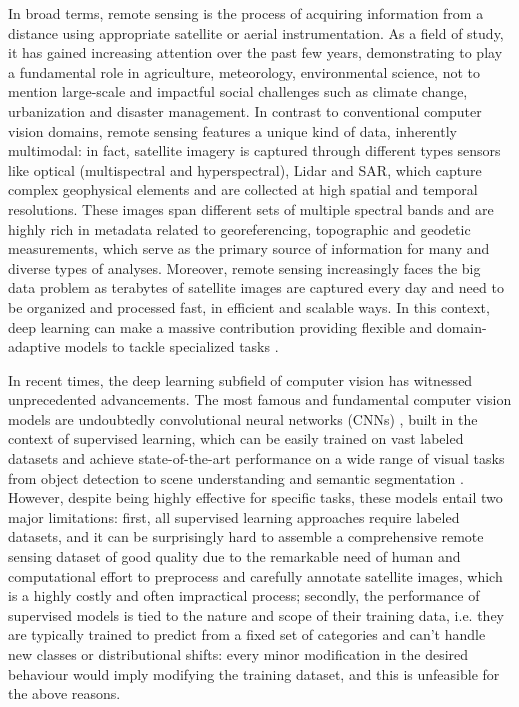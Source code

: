 \documentclass[a4paper, oneside, english]{sapthesis} %
\begin{document}
In broad terms, remote sensing is the process of acquiring information from a distance using appropriate satellite or aerial instrumentation. As a field of study, it has gained increasing attention over the past few years, demonstrating to play a fundamental role in agriculture, meteorology, environmental science, not to mention large-scale and impactful social challenges such as climate change, urbanization and disaster management. In contrast to conventional computer vision domains, remote sensing features a unique kind of data, inherently multimodal: in fact, satellite imagery is captured through different types sensors like optical (multispectral and hyperspectral), Lidar and SAR, which capture complex geophysical elements and are collected at high spatial and temporal resolutions. These images span different sets of multiple spectral bands and are highly rich in metadata related to georeferencing, topographic and geodetic measurements, which serve as the primary source of information for many and diverse types of analyses. Moreover, remote sensing increasingly faces the big data problem as terabytes of satellite images are captured every day and need to be organized and processed fast, in efficient and scalable ways. In this context, deep learning can make a massive contribution providing flexible and domain-adaptive models to tackle specialized tasks \cite{zhu2017deep}.

In recent times, the deep learning subfield of computer vision \cite{szeliski2022computer} has witnessed unprecedented advancements. The most famous and fundamental computer vision models are undoubtedly convolutional neural networks (CNNs) \cite{lecun1989backpropagation}, built in the context of supervised learning, which can be easily trained on vast labeled datasets and achieve state-of-the-art performance on a wide range of visual tasks from object detection \cite{viola2001rapid} to scene understanding \cite{oliva2001modeling} and semantic segmentation \cite{shotton2008semantic}. However, despite being highly effective for specific tasks, these models entail two major limitations: first, all supervised learning approaches require labeled datasets, and it can be surprisingly hard to assemble a comprehensive remote sensing dataset of good quality due to the remarkable need of human and computational effort to preprocess and carefully annotate satellite images, which is a highly costly and often impractical process; secondly, the performance of supervised models is tied to the nature and scope of their training data, i.e. they are typically trained to predict from a fixed set of categories and can't handle new classes or distributional shifts: every minor modification in the desired behaviour would imply modifying the training dataset, and this is unfeasible for the above reasons.
\end{document}
